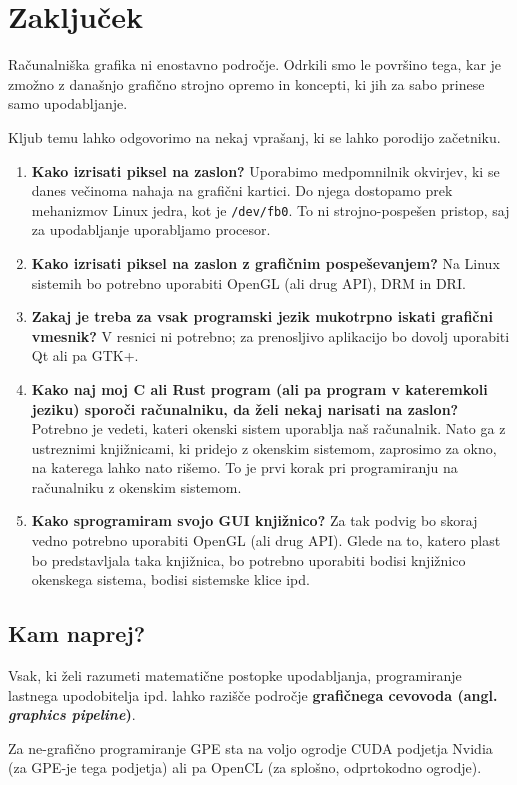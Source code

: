 \documentclass{article}
\begin{document}
\newpage

\section*{Zaključek}
Računalniška grafika ni enostavno področje. Odrkili smo le površino tega, kar je zmožno z današnjo grafično strojno opremo in koncepti, ki jih za sabo prinese samo upodabljanje.

Kljub temu lahko odgovorimo na nekaj vprašanj, ki se lahko porodijo začetniku.

\begin{enumerate}
    \item \textbf{Kako izrisati piksel na zaslon?} Uporabimo medpomnilnik okvirjev, ki se danes večinoma nahaja na grafični kartici. Do njega dostopamo prek mehanizmov Linux jedra, kot je \texttt{/dev/fb0}. To ni strojno-pospešen pristop, saj za upodabljanje uporabljamo procesor.
    \item \textbf{Kako izrisati piksel na zaslon z grafičnim pospeševanjem?} Na Linux sistemih bo potrebno uporabiti OpenGL (ali drug API), DRM in DRI.
    \item \textbf{Zakaj je treba za vsak programski jezik mukotrpno iskati grafični vmesnik?} V resnici ni potrebno; za prenosljivo aplikacijo bo dovolj uporabiti Qt ali pa GTK+.
    \item \textbf{Kako naj moj C ali Rust program (ali pa program v kateremkoli jeziku) sporoči računalniku, da želi nekaj narisati na zaslon?} Potrebno je vedeti, kateri okenski sistem uporablja naš računalnik. Nato ga z ustreznimi knjižnicami, ki pridejo z okenskim sistemom, zaprosimo za okno, na katerega lahko nato rišemo. To je prvi korak pri programiranju na računalniku z okenskim sistemom.
    \item \textbf{Kako sprogramiram svojo GUI knjižnico?} Za tak podvig bo skoraj vedno potrebno uporabiti OpenGL (ali drug API). Glede na to, katero plast bo predstavljala taka knjižnica, bo potrebno uporabiti bodisi knjižnico okenskega sistema, bodisi sistemske klice ipd.
\end{enumerate}

\subsection*{Kam naprej?}
Vsak, ki želi razumeti matematične postopke upodabljanja, programiranje lastnega upodobitelja ipd. lahko razišče področje \textbf{grafičnega cevovoda (angl. \textit{graphics pipeline})}.

Za ne-grafično programiranje GPE sta na voljo ogrodje CUDA podjetja Nvidia (za GPE-je tega podjetja) ali pa OpenCL (za splošno, odprtokodno ogrodje).

\newpage
\printbibliography
\end{document}
